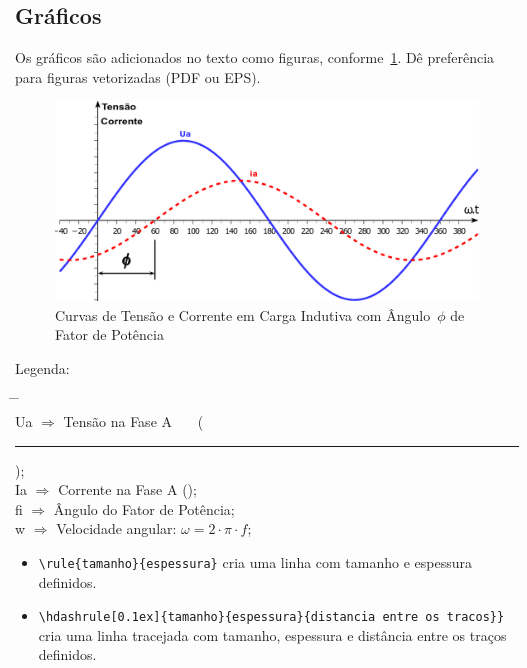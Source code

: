 \pagebreak

\subsection{Gráficos}

Os gráficos são adicionados no texto como figuras, conforme~\ref{fig:GraficoFP}. Dê preferência para figuras vetorizadas (PDF ou EPS).

\begin{figure}[htb]
    \centering
    \includegraphics[width=15.3cm]{arquivos/GraficoFP.pdf}
    \caption{Curvas de Tensão e Corrente em Carga Indutiva com Ângulo~$\phi$ de Fator de Potência}
    \label{fig:GraficoFP}
\end{figure}  

Legenda:\\
\vspace{-1.3cm}
\begin{tabbing}
    \hspace{1cm}  \= \hspace{1cm} \= \kill \\
    \gls{Ua}      \> $\Rightarrow$ \> Tensão na Fase A ~~~(\textcolor{blue}{\rule{3cm}{1mm}}); \\
    \gls{Ia}      \> $\Rightarrow$ \> Corrente na Fase A (\textcolor{red}{\hdashrule[0.1ex]{3.1cm}{1mm}{2mm}}); \\
    \gls{fi}    \> $\Rightarrow$ \> Ângulo do Fator de Potência; \\
    \gls{w}    \> $\Rightarrow$ \> Velocidade angular: $\omega=2\cdot \pi \cdot f$;    
\end{tabbing}

\begin{itemize}
    \item \verb|\rule{tamanho}{espessura}| cria uma linha com tamanho e espessura definidos. 
    \item \verb|\hdashrule[0.1ex]{tamanho}{espessura}{distancia entre os tracos}}| cria uma linha tracejada com tamanho, espessura e distância entre os traços definidos.
\end{itemize}

